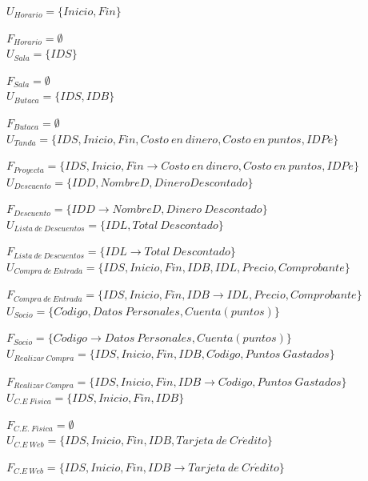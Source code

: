 	$U_{Horario}=\{Inicio, Fin\}$
		
	$F_{Horario}=\emptyset$\\
	
	$U_{Sala}=\{IDS\}$
	
	$F_{Sala}=\emptyset$\\
	
	$U_{Butaca}=\{IDS,IDB\}$
		
	$F_{Butaca}=\emptyset$\\
	
	$U_{Tanda}=\{IDS, Inicio, Fin, Costo~en~dinero, Costo~en~puntos, IDPe\}$
	
	$F_{Proyecta}=\{IDS, Inicio, Fin\rightarrow Costo~en~dinero, Costo~en~puntos, IDPe\}$\\
	
	$U_{Descuento}=\{IDD, NombreD, DineroDescontado\}$
		
	$F_{Descuento}=\{IDD\rightarrow NombreD, Dinero~Descontado\}$\\
	
	$U_{Lista~de~Descuentos}=\{IDL,Total~Descontado\}$
		
	$F_{Lista~de~Descuentos}=\{IDL\rightarrow Total~Descontado\}$\\
	
	$U_{Compra~de~Entrada}=\{IDS, Inicio, Fin, IDB, IDL, Precio, Comprobante\}$
		
	$F_{Compra~de~Entrada}=\{IDS, Inicio, Fin,IDB\rightarrow IDL, Precio, Comprobante\}$\\
	
	$U_{Socio}=\{C\acute{o}digo,Datos~Personales,Cuenta(puntos)\}$
		
	$F_{Socio}=\{C\acute{o}digo\rightarrow Datos~Personales,Cuenta(puntos)\}$\\
	
	$U_{Realizar~Compra}=\{IDS,Inicio,Fin,IDB,C\acute{o}digo,Puntos~Gastados\}$
		
	$F_{Realizar~Compra}=\{IDS,Inicio,Fin,IDB\rightarrow C\acute{o}digo,Puntos~Gastados\}$\\
	
	$U_{C.E~Fisica}=\{IDS,Inicio,Fin,IDB\}$
		
	$F_{C.E.~Fisica}=\emptyset$\\
	
	$U_{C.E~Web}=\{IDS,Inicio,Fin,IDB,Tarjeta~de~Cr\acute{e}dito\}$
		
	$F_{C.E~Web}=\{IDS,Inicio,Fin,IDB\rightarrow Tarjeta~de~Cr\acute{e}dito\}$\\
		
